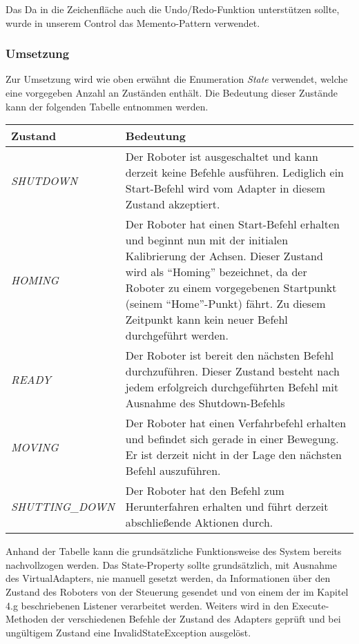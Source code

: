 Das  Da in die Zeichenfläche auch die Undo/Redo-Funktion unterstützen sollte, wurde in unserem Control das Memento-Pattern verwendet.

\subsubsection{Umsetzung}
Zur Umsetzung wird wie oben erwähnt die Enumeration \textit{State} verwendet, welche eine vorgegeben Anzahl an Zuständen enthält. Die Bedeutung dieser Zustände kann der folgenden Tabelle entnommen werden.
\newline
\begin{tabular}{|p{4cm}|p{10cm}|}
\hline \rowcolor{lightgray}
\textbf{Zustand} & \textbf{Bedeutung}\\
\hline
\textit{SHUTDOWN} & Der Roboter ist ausgeschaltet und kann derzeit keine Befehle ausführen. Lediglich ein Start-Befehl wird vom Adapter in diesem Zustand akzeptiert.\\
\hline
\textit{HOMING} & Der Roboter hat einen Start-Befehl erhalten und beginnt nun mit der initialen Kalibrierung der Achsen. Dieser Zustand wird als “Homing” bezeichnet, da der Roboter zu einem vorgegebenen Startpunkt (seinem “Home”-Punkt) fährt. Zu diesem Zeitpunkt kann kein neuer Befehl durchgeführt werden.\\
\hline
\textit{READY} & Der Roboter ist bereit den nächsten Befehl durchzuführen. Dieser Zustand besteht nach jedem erfolgreich durchgeführten Befehl mit Ausnahme des Shutdown-Befehls \\
\hline
\textit{MOVING} & Der Roboter hat einen Verfahrbefehl erhalten und befindet sich gerade in einer Bewegung. Er ist derzeit nicht in der Lage den nächsten Befehl auszuführen.\\
\hline
\textit{SHUTTING\_DOWN} & Der Roboter hat den Befehl zum Herunterfahren erhalten und führt derzeit abschließende Aktionen durch.\\ 
\hline
\end{tabular}
\newline
\newline
Anhand der Tabelle kann die grundsätzliche Funktionsweise des System bereits nachvollzogen werden. Das State-Property sollte grundsätzlich, mit Ausnahme des VirtualAdapters, nie manuell gesetzt werden, da Informationen über den Zustand des Roboters von der Steuerung gesendet und von einem der im Kapitel 4.g beschriebenen Listener verarbeitet werden. Weiters wird in den Execute-Methoden der verschiedenen Befehle der Zustand des Adapters geprüft und bei ungültigem Zustand eine InvalidStateException ausgelöst.
